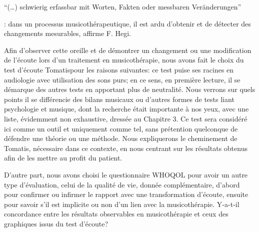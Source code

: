  \begin{german}
 ``(\ldots) schwierig erfassbar mit Worten, Fakten oder messbaren 
 Veränderungen''
 \end{german}  \autocite[175]{hegi_improvisation_1993}: dans un processus 
 	musicothérapeutique, il  
 est ardu d'obtenir et de détecter  des changements mesurables, 
  affirme F. Hegi.
 

 
 Afin d'observer cette oreille et de démontrer un changement ou une modification de l'écoute lors d'un 
 traitement en musicothérapie, %
  nous  avons fait le choix du test d'écoute Tomatis\textsuperscript \textregistered  pour 
 les raisons suivantes:  ce test 
 puise ses racines  en 
 audiologie avec utilisation des sons purs; en ce sens, en première lecture, il se démarque des autres 
 tests en apportant plus de neutralité. Nous verrons sur quels points il se différencie des bilans musicaux 
 ou 
 d'autres formes de tests liant psychologie et musique, dont la recherche était importante à nos yeux, 
 avec une liste, 
 évidemment non exhaustive, dressée au Chapitre 3. 
  Ce test sera considéré ici 
 comme un outil et uniquement comme tel, sans prétention quelconque de défendre une théorie ou une 
 méthode. Nous expliquerons le cheminement de Tomatis, nécessaire dans ce contexte, en  nous 
 centrant sur les 
 résultats obtenus afin de les mettre 
 au profit du patient.
 
 D'autre part, nous avons choisi le questionnaire WHOQOL pour avoir un autre type 
 d'évaluation, celui 
 de la qualité de vie, donnée complémentaire, d'abord  pour confirmer ou infirmer le rapport avec une  
 transformation d'écoute, ensuite pour savoir s'il est implicite  ou non d'un lien avec la musicothérapie.
 Y-a-t-il concordance entre  %
 les résultats observables en musicothérapie et ceux des  graphiques issus du test d'écoute?
 

